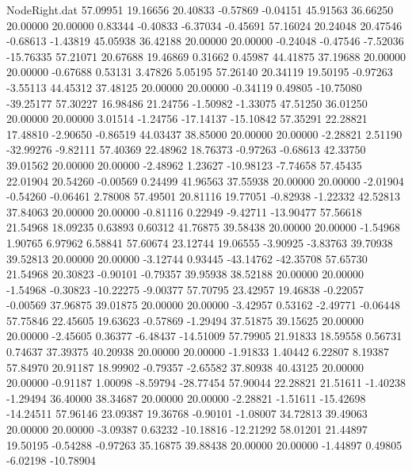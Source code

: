\begin{filecontents}{NodeRight.dat}
  57.09951   19.16656   20.40833    -0.57869   -0.04151   45.91563   36.66250   20.00000   20.00000    0.83344   -0.40833   -6.37034   -0.45691
  57.16024   20.24048   20.47546    -0.68613   -1.43819   45.05938   36.42188   20.00000   20.00000   -0.24048   -0.47546   -7.52036  -15.76335
  57.21071   20.67688   19.46869     0.31662    0.45987   44.41875   37.19688   20.00000   20.00000   -0.67688    0.53131    3.47826    5.05195
  57.26140   20.34119   19.50195    -0.97263   -3.55113   44.45312   37.48125   20.00000   20.00000   -0.34119    0.49805  -10.75080  -39.25177
  57.30227   16.98486   21.24756    -1.50982   -1.33075   47.51250   36.01250   20.00000   20.00000    3.01514   -1.24756  -17.14137  -15.10842
  57.35291   22.28821   17.48810    -2.90650   -0.86519   44.03437   38.85000   20.00000   20.00000   -2.28821    2.51190  -32.99276   -9.82111
  57.40369   22.48962   18.76373    -0.97263   -0.68613   42.33750   39.01562   20.00000   20.00000   -2.48962    1.23627  -10.98123   -7.74658
  57.45435   22.01904   20.54260    -0.00569    0.24499   41.96563   37.55938   20.00000   20.00000   -2.01904   -0.54260   -0.06461    2.78008
  57.49501   20.81116   19.77051    -0.82938   -1.22332   42.52813   37.84063   20.00000   20.00000   -0.81116    0.22949   -9.42711  -13.90477
  57.56618   21.54968   18.09235     0.63893    0.60312   41.76875   39.58438   20.00000   20.00000   -1.54968    1.90765    6.97962    6.58841
  57.60674   23.12744   19.06555    -3.90925   -3.83763   39.70938   39.52813   20.00000   20.00000   -3.12744    0.93445  -43.14762  -42.35708
  57.65730   21.54968   20.30823    -0.90101   -0.79357   39.95938   38.52188   20.00000   20.00000   -1.54968   -0.30823  -10.22275   -9.00377
  57.70795   23.42957   19.46838    -0.22057   -0.00569   37.96875   39.01875   20.00000   20.00000   -3.42957    0.53162   -2.49771   -0.06448
  57.75846   22.45605   19.63623    -0.57869   -1.29494   37.51875   39.15625   20.00000   20.00000   -2.45605    0.36377   -6.48437  -14.51009
  57.79905   21.91833   18.59558     0.56731    0.74637   37.39375   40.20938   20.00000   20.00000   -1.91833    1.40442    6.22807    8.19387
  57.84970   20.91187   18.99902    -0.79357   -2.65582   37.80938   40.43125   20.00000   20.00000   -0.91187    1.00098   -8.59794  -28.77454
  57.90044   22.28821   21.51611    -1.40238   -1.29494   36.40000   38.34687   20.00000   20.00000   -2.28821   -1.51611  -15.42698  -14.24511
  57.96146   23.09387   19.36768    -0.90101   -1.08007   34.72813   39.49063   20.00000   20.00000   -3.09387    0.63232  -10.18816  -12.21292
  58.01201   21.44897   19.50195    -0.54288   -0.97263   35.16875   39.88438   20.00000   20.00000   -1.44897    0.49805   -6.02198  -10.78904

\end{filecontents}
